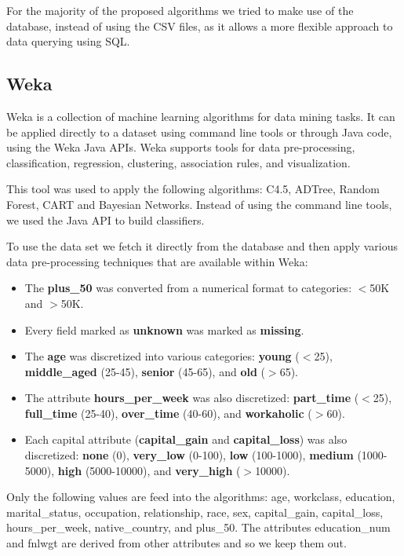 \documentclass[a4paper]{llncs}
\begin{document}
For the majority of the proposed algorithms we tried to make use of the database, instead
of using the CSV files, as it allows a more flexible approach to data querying using SQL.

\subsection{Weka}
\label{sec:weka}

Weka is a collection of machine learning algorithms for data mining tasks. \cite{weka}
It can be applied directly to a dataset using command line tools or through Java code, using the Weka Java APIs.
Weka supports tools for data pre-processing, classification, regression, clustering, association rules,
and visualization.

This tool was used to apply the following algorithms: C4.5, ADTree, Random Forest, CART and Bayesian Networks.
Instead of using the command line tools, we used the Java API to build classifiers.

To use the data set we fetch it directly from the database and then apply various data pre-processing
techniques that are available within Weka:

\begin{itemize}
  \item The \textbf{plus\_50} was converted from a numerical format to categories: $<$50K and $>$50K.
  \item Every field marked as \textbf{unknown} was marked as \textbf{missing}.
  \item The \textbf{age} was discretized into various categories: \textbf{young} ($<$25),
    \textbf{middle\_aged} (25-45), \textbf{senior} (45-65), and \textbf{old} ($>$65).
  \item The attribute \textbf{hours\_per\_week} was also discretized: \textbf{part\_time} ($<$25),
    \textbf{full\_time} (25-40), \textbf{over\_time} (40-60), and \textbf{workaholic} ($>$60).
  \item Each capital attribute (\textbf{capital\_gain} and \textbf{capital\_loss}) was also discretized:
    \textbf{none} (0), \textbf{very\_low} (0-100), \textbf{low} (100-1000), \textbf{medium} (1000-5000),
    \textbf{high} (5000-10000), and \textbf{very\_high} ($>$10000).
\end{itemize}

Only the following values are feed into the algorithms: age, workclass, education,
marital\_status, occupation, relationship, race, sex, capital\_gain, capital\_loss,
hours\_per\_week, native\_country, and plus\_50. The attributes education\_num
and fnlwgt are derived from other attributes and so we keep them out.
\end{document}
